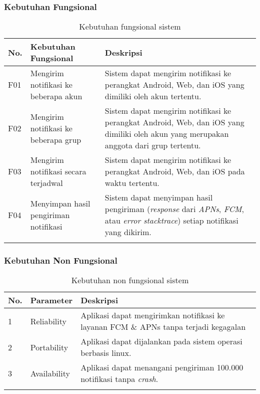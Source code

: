         \subsubsection{Kebutuhan Fungsional}
        \begin{longtable}{|p{2cm}|p{2cm}|p{4cm}|}
            \hline
		    \textbf{No.} & \textbf{Kebutuhan Fungsional} & \textbf{Deskripsi} \\
    		\hline
		    F01 & Mengirim notifikasi ke beberapa akun & Sistem dapat mengirim notifikasi ke perangkat Android, Web, dan iOS yang dimiliki oleh akun tertentu. \\
    		\hline
		    F02 & Mengirim notifikasi ke beberapa grup & Sistem dapat mengirim notifikasi ke perangkat Android, Web, dan iOS yang dimiliki oleh akun yang merupakan anggota dari grup tertentu. \\
    		\hline
		    F03 & Mengirim notifikasi secara terjadwal & Sistem dapat mengirim notifikasi ke perangkat Android, Web, dan iOS pada waktu tertentu. \\
    		\hline
		    F04 & Menyimpan hasil pengiriman notifikasi & Sistem dapat menyimpan hasil pengiriman (\textit{response} dari \textit{APNs}, \textit{FCM}, atau \textit{error stacktrace}) setiap notifikasi yang dikirim. \\
    		\hline
            \caption{Kebutuhan fungsional sistem}
        \end{longtable}

        \subsubsection{Kebutuhan Non Fungsional}
        \begin{longtable}{|p{1cm}|p{2cm}|p{5cm}|}
            \hline
            \textbf{No.} & \textbf{Parameter} & \textbf{Deskripsi}  \\
            \hline
            1 & Reliability & Aplikasi dapat mengirimkan notifikasi ke layanan FCM \& APNs tanpa terjadi kegagalan \\
            \hline
            2 & Portability & Aplikasi dapat dijalankan pada sistem operasi berbasis linux. \\
            \hline
            3 & Availability & Aplikasi dapat menangani pengiriman 100.000 notifikasi tanpa \textit{crash}. \\
            \hline
            \caption{Kebutuhan non fungsional sistem}
        \end{longtable}

